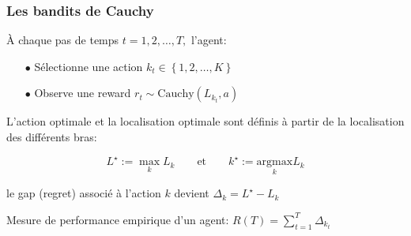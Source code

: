 \documentclass[8pt,sans,aspectratio=169]{beamer}
\begin{document}
\begin{frame}

\frametitle{Les bandits de Cauchy}

À chaque pas de temps $t=1,2,\ldots,T,$ l'agent:

\begin{itemize}

\item[$\bullet$] Sélectionne une action $k_t\in\left\{1,2,\ldots,K\right\}$

\item[$\bullet$] Observe une reward $r_t\sim \mathrm{Cauchy}(L_{k_t},a)$

\end{itemize}

\vfill
\pause

L'action optimale et la localisation optimale sont définis à partir de la localisation des différents bras:

\pause
$$\displaystyle L^{\star} := \max_k L_k \qquad \text{et} \qquad k^{\star} := \underset{k}{\mathrm{argmax}} L_k$$ 

\pause
\vfill

le gap (regret) associé à l'action $k$ devient $\Delta_k= L^{\star}-L_k$ 

\pause
\vfill

Mesure de performance empirique d'un agent: $\displaystyle R(T)=\sum_{t=1}^T \Delta_{k_t}$

\end{frame}
\end{document}
